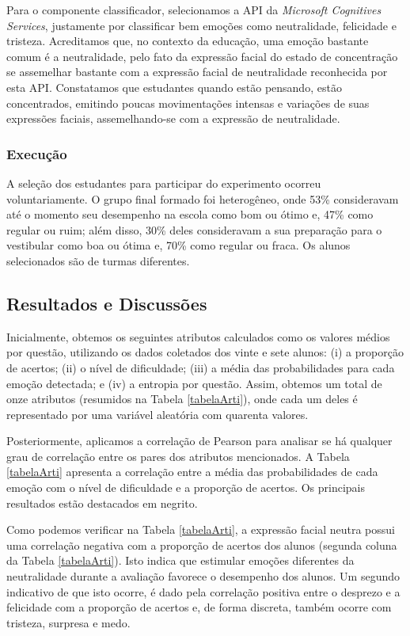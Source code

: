 Para o componente classificador, selecionamos a API da \textit{Microsoft Cognitives Services}, justamente por classificar bem emoções como neutralidade, felicidade e tristeza. Acreditamos que, no contexto da educação, uma emoção bastante comum é a neutralidade, pelo fato da expressão facial do estado de concentração se assemelhar bastante com a expressão facial de neutralidade reconhecida por esta API. Constatamos que estudantes quando estão pensando, estão concentrados, emitindo poucas movimentações intensas e variações de suas expressões faciais, assemelhando-se com a expressão de neutralidade.

\subsubsection{Execução}
A seleção dos estudantes para participar do experimento ocorreu voluntariamente. O grupo final formado foi heterogêneo, onde 53\% consideravam até o momento seu desempenho na escola como bom ou ótimo e, 47\% como regular ou ruim; além disso, 30\% deles consideravam a sua preparação para o vestibular como boa ou ótima e, 70\% como regular ou fraca. Os alunos selecionados são de turmas diferentes.

\subsection{Resultados e Discussões}
Inicialmente, obtemos os seguintes atributos calculados como os valores médios por questão, utilizando os dados coletados dos vinte e sete alunos: (i) a proporção de acertos; (ii) o nível de dificuldade; (iii) a média das probabilidades para cada emoção detectada; e (iv) a entropia por questão. Assim, obtemos um total de onze atributos (resumidos na Tabela \ref{tabelaArti}), onde cada um deles é representado por uma variável aleatória com quarenta valores.

Posteriormente, aplicamos a correlação de Pearson para analisar se há qualquer grau de correlação entre os pares dos atributos mencionados. A Tabela \ref{tabelaArti} apresenta a correlação entre a média das probabilidades de cada emoção com o nível de dificuldade e a proporção de acertos. Os principais resultados estão destacados em negrito.

Como podemos verificar na Tabela \ref{tabelaArti}, a expressão facial neutra possui uma correlação negativa com a proporção de acertos dos alunos (segunda coluna da Tabela \ref{tabelaArti}). Isto indica que estimular emoções diferentes da neutralidade durante a avaliação favorece o desempenho dos alunos. Um segundo indicativo de que isto ocorre, é dado pela correlação positiva entre o desprezo e a felicidade com a proporção de acertos e, de forma discreta, também ocorre com tristeza, surpresa e medo.

